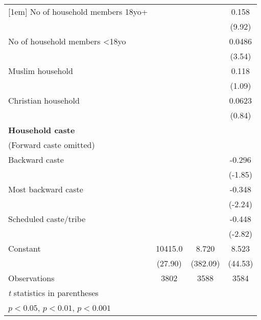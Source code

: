 {\begin{tabular}{l*{3}{c}}
[1em]
No of household members 18yo+&                     &                     &       0.158\sym{***}\\
                    &                     &                     &      (9.92)         \\
[1em]
No of household members \textless{}18yo&                     &                     &      0.0486\sym{***}\\
                    &                     &                     &      (3.54)         \\
[1em]
Muslim household    &                     &                     &       0.118         \\
                    &                     &                     &      (1.09)         \\
[1em]
Christian household &                     &                     &      0.0623         \\
                    &                     &                     &      (0.84)         \\
[1em]
\textbf{Household caste} \\ (Forward caste omitted)&                     &                     &                     \\
[1em]
Backward caste      &                     &                     &      -0.296         \\
                    &                     &                     &     (-1.85)         \\
[1em]
Most backward caste &                     &                     &      -0.348\sym{*}  \\
                    &                     &                     &     (-2.24)         \\
[1em]
Scheduled caste/tribe&                     &                     &      -0.448\sym{**} \\
                    &                     &                     &     (-2.82)         \\
[1em]
Constant            &     10415.0\sym{***}&       8.720\sym{***}&       8.523\sym{***}\\
                    &     (27.90)         &    (382.09)         &     (44.53)         \\
\hline
Observations        &        3802         &        3588         &        3584         \\
\hline\hline
\multicolumn{4}{l}{\footnotesize \textit{t} statistics in parentheses}\\
\multicolumn{4}{l}{\footnotesize \sym{*} \(p<0.05\), \sym{**} \(p<0.01\), \sym{***} \(p<0.001\)}\\
\end{tabular}
}
